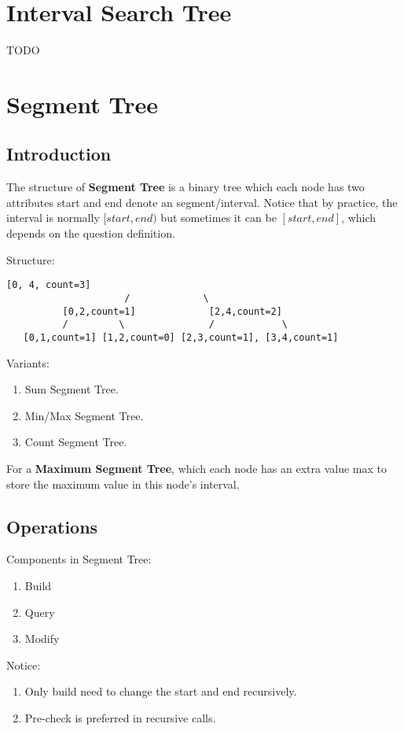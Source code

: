 \section{Interval Search Tree}
TODO

\section{Segment Tree}
\subsection{Introduction}
The structure of \textbf{Segment Tree} is a binary tree which each node has two attributes start and end denote an segment/interval. Notice that by practice, the interval is normally $[start, end)$ but sometimes it can be $[start, end]$, which depends on the question definition. 

Structure:  
\begin{lstlisting}[columns=flexible]
                     [0, 4, count=3]
                     /             \
          [0,2,count=1]             [2,4,count=2]
          /         \               /            \
   [0,1,count=1] [1,2,count=0] [2,3,count=1], [3,4,count=1]
\end{lstlisting}

Variants:
\begin{enumerate}
\item Sum Segment Tree.
\item Min/Max Segment Tree.
\item Count Segment Tree. 
\end{enumerate}

For a \textbf{Maximum Segment Tree}, which each node has an extra value max
to store the maximum value in this node's interval.

\subsection{Operations}
Components in Segment Tree:
\begin{enumerate}
\item Build
\item Query 
\item Modify 
\end{enumerate}

Notice:
\begin{enumerate}
\item Only build need to change the start and end recursively.
\item Pre-check is preferred in recursive calls.
\end{enumerate}


